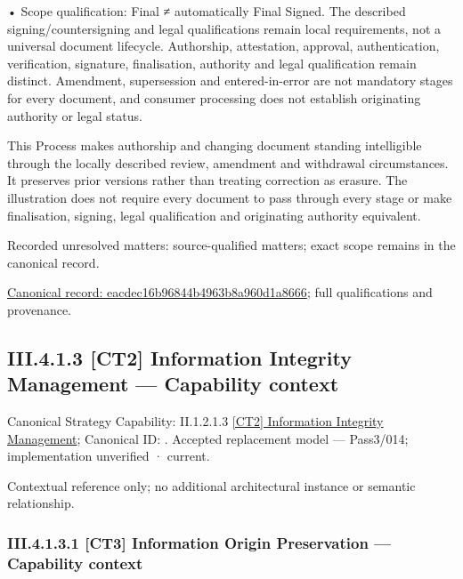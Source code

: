 •
Scope qualification: Final ≠ automatically Final Signed. The described signing/countersigning and legal qualifications remain local requirements, not a universal document lifecycle. Authorship, attestation, approval, authentication, verification, signature, finalisation, authority and legal qualification remain distinct. Amendment, supersession and entered-in-error are not mandatory stages for every document, and consumer processing does not establish originating authority or legal status.



This Process makes authorship and changing document standing intelligible through the locally described review, amendment and withdrawal circumstances. It preserves prior versions rather than treating correction as erasure. The illustration does not require every document to pass through every stage or make finalisation, signing, legal qualification and originating authority equivalent.


{\small Recorded unresolved matters: source-qualified matters; exact scope remains in the canonical record.}\par
{\footnotesize \href{../../../../../../../../continuum/business/business-process/eacdec16b96844b4963b8a960d1a8666.md}{Canonical record: eacdec16b96844b4963b8a960d1a8666}; full qualifications and provenance.}\par
\subsection*{III.4.1.3 [CT2] Information Integrity Management — Capability context}
\label{navigation:III.4.1.3}

{\small Canonical Strategy Capability: II.1.2.1.3 \hyperref[element:f1ea1db460204cd8a99768c16dbb0b31]{[CT2] Information Integrity Management}; Canonical ID: \texttt{}. Accepted replacement model — Pass3/014; implementation unverified · current.}\par
Contextual reference only; no additional architectural instance or semantic relationship.\par
\subsubsection*{III.4.1.3.1 [CT3] Information Origin Preservation — Capability context}
\label{navigation:III.4.1.3.1}

